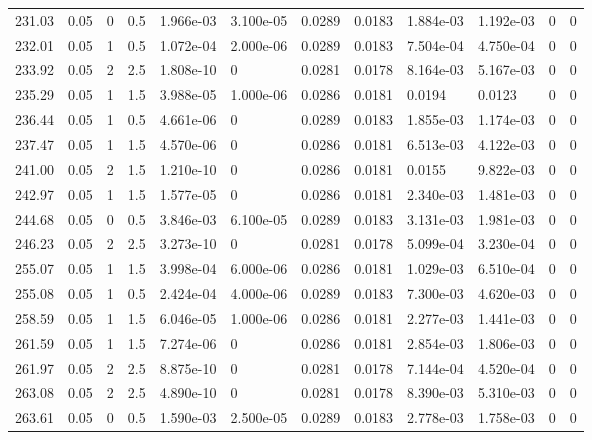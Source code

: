 \documentclass[preview]{standalone}
\begin{document}
{{{{\begin{tabular}{L{1.2cm}C{1.2cm} C{0.3cm}C{0.5cm} C{1.4cm}C{1.4cm} C{1.4cm}C{1.4cm} C{1.6cm}C{1.6cm} C{1.6cm}C{1.6cm}}
  231.03  &  0.05  & 0     & 0.5 &  1.966e-03  & 3.100e-05  &  0.0289&   0.0183& 1.884e-03 & 1.192e-03   &  0 & 0  \\ 
  232.01  &  0.05  & 1     & 0.5 &  1.072e-04  & 2.000e-06  &  0.0289&   0.0183& 7.504e-04 & 4.750e-04   &  0 & 0  \\ 
  233.92  &  0.05  & 2     & 2.5 &  1.808e-10  & 0  &  0.0281&   0.0178& 8.164e-03 & 5.167e-03   &  0 & 0  \\ 
  235.29  &  0.05  & 1     & 1.5 &  3.988e-05  & 1.000e-06  &  0.0286&   0.0181& 0.0194 & 0.0123   &  0 & 0  \\ 
  236.44  &  0.05  & 1     & 0.5 &  4.661e-06  & 0  &  0.0289&   0.0183& 1.855e-03 & 1.174e-03   &  0 & 0  \\ 
  237.47  &  0.05  & 1     & 1.5 &  4.570e-06  & 0  &  0.0286&   0.0181& 6.513e-03 & 4.122e-03   &  0 & 0  \\ 
  241.00  &  0.05  & 2     & 1.5 &  1.210e-10  & 0  &  0.0286&   0.0181& 0.0155 & 9.822e-03   &  0 & 0  \\ 
  242.97  &  0.05  & 1     & 1.5 &  1.577e-05  & 0  &  0.0286&   0.0181& 2.340e-03 & 1.481e-03   &  0 & 0  \\ 
  244.68  &  0.05  & 0     & 0.5 &  3.846e-03  & 6.100e-05  &  0.0289&   0.0183& 3.131e-03 & 1.981e-03   &  0 & 0  \\ 
  246.23  &  0.05  & 2     & 2.5 &  3.273e-10  & 0  &  0.0281&   0.0178& 5.099e-04 & 3.230e-04   &  0 & 0  \\ 
  255.07  &  0.05  & 1     & 1.5 &  3.998e-04  & 6.000e-06  &  0.0286&   0.0181& 1.029e-03 & 6.510e-04   &  0 & 0  \\ 
  255.08  &  0.05  & 1     & 0.5 &  2.424e-04  & 4.000e-06  &  0.0289&   0.0183& 7.300e-03 & 4.620e-03   &  0 & 0  \\ 
  258.59  &  0.05  & 1     & 1.5 &  6.046e-05  & 1.000e-06  &  0.0286&   0.0181& 2.277e-03 & 1.441e-03   &  0 & 0  \\ 
  261.59  &  0.05  & 1     & 1.5 &  7.274e-06  & 0  &  0.0286&   0.0181& 2.854e-03 & 1.806e-03   &  0 & 0  \\ 
  261.97  &  0.05  & 2     & 2.5 &  8.875e-10  & 0  &  0.0281&   0.0178& 7.144e-04 & 4.520e-04   &  0 & 0  \\ 
  263.08  &  0.05  & 2     & 2.5 &  4.890e-10  & 0  &  0.0281&   0.0178& 8.390e-03 & 5.310e-03   &  0 & 0  \\ 
  263.61  &  0.05  & 0     & 0.5 &  1.590e-03  & 2.500e-05  &  0.0289&   0.0183& 2.778e-03 & 1.758e-03   &  0 & 0  \\ 

\end{tabular}}}}}
\end{document}
